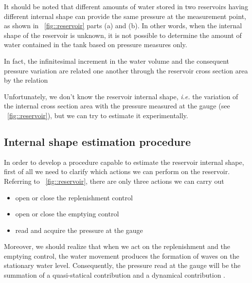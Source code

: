 \documentclass[journal]{IEEEtran}
\begin{document}
It should be noted that different amounts of water stored in two reservoirs having different internal shape can provide the same pressure at the measurement point, as shown in \figurename~\ref{fig::reservoir} parts (a) and (b). In other words, when the internal shape of the reservoir is unknown, it is not possible to determine the amount of water contained in the tank based on pressure measures only.

In fact, the infinitesimal increment in the water volume  and the consequent pressure variation  are related one another through the reservoir cross section area  by the relation 

Unfortunately, we don't know the reservoir internal shape, \textit{i.e.} the variation of the internal cross section area  with the pressure measured at the gauge (see \figurename~\ref{fig::reservoir}),
but we can try to estimate it experimentally.
\subsection{Internal shape estimation procedure}
In order to develop a procedure capable to estimate the reservoir internal shape, first of all we need to clarify which actions we can perform on the reservoir. Referring to \figurename~\ref{fig::reservoir}, there are only three actions we can carry out
\begin{itemize}
\item open or close the replenishment control
\item open or close the emptying control
\item read and acquire the pressure  at the gauge
\end{itemize}
Moreover, we should realize that when we act on the replenishment and the emptying control, the water movement produces the formation of waves on the stationary water level.  
Consequently, the pressure  read at the gauge will be the summation of a quasi-statical contribution  and a dynamical contribution .
\end{document}
